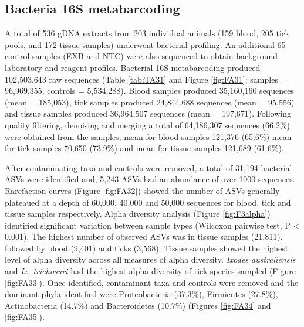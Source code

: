 \documentclass[a4paper, nobind]{templates/ociamthesis}
\begin{document}
\hypertarget{bacteria-16s-metabarcoding}{%
\subsection{Bacteria 16S metabarcoding}\label{bacteria-16s-metabarcoding}}

A total of 536 gDNA extracts from 203 individual animals (159 blood, 205 tick pools, and 172 tissue samples) underwent bacterial profiling.
An additional 65 control samples (EXB and NTC) were also sequenced to obtain background laboratory and reagent profiles.
Bacterial 16S metabarcoding produced 102,503,643 raw sequences (Table \ref{tab:TA31} and Figure \ref{fig:FA31}; samples = 96,969,355, controls = 5,534,288).
Blood samples produced 35,160,160 sequences (mean = 185,053), tick samples produced 24,844,688 sequences (mean = 95,556) and tissue samples produced 36,964,507 sequences (mean = 197,671).
Following quality filtering, denoising and merging a total of 64,186,307 sequences (66.2\%) were obtained from the samples; mean for blood samples 121,376 (65.6\%) mean for tick samples 70,650 (73.9\%) and mean for tissue samples 121,689 (61.6\%).

After contaminating taxa and controls were removed, a total of 31,194 bacterial ASVs were identified and, 5,243 ASVs had an abundance of over 1000 sequences.
Rarefaction curves (Figure \ref{fig:FA32}) showed the number of ASVs generally plateaued at a depth of 60,000, 40,000 and 50,000 sequences for blood, tick and tissue samples respectively.
Alpha diversity analysis (Figure \ref{fig:F3alpha}) identified significant variation between sample types (Wilcoxon pairwise test, P \textless{} 0.001).
The highest number of observed ASVs was in tissue samples (21,811), followed by blood (9,401) and ticks (3,568).
Tissue samples showed the highest level of alpha diversity across all measures of alpha diversity.
\emph{Ixodes australiensis} and \emph{Ix. trichosuri} had the highest alpha diversity of tick species sampled (Figure \ref{fig:FA33}).
Once identified, contaminant taxa and controls were removed and the dominant phyla identified were Proteobacteria (37.3\%), Firmicutes (27.8\%), Actinobacteria (14.7\%) and Bacteroidetes (10.7\%) (Figures \ref{fig:FA34} and \ref{fig:FA35}).
\end{document}
